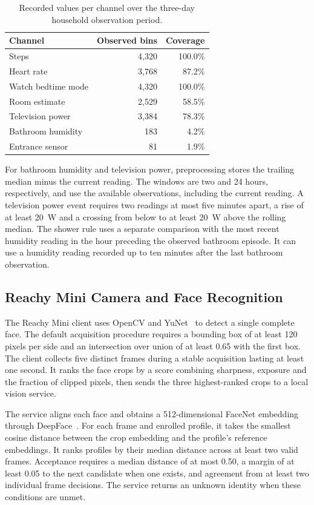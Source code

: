\documentclass[a4paper,twoside]{article}
\begin{document}
\begin{table}[t]
\centering
\caption{Recorded values per channel over the three-day household observation period.}
\label{tab:coverage}
\small
\begin{tabular}{@{}lrr@{}}
\hline
Channel & Observed bins & Coverage \\
\hline
Steps & 4,320 & 100.0\% \\
Heart rate & 3,768 & 87.2\% \\
Watch bedtime mode & 4,320 & 100.0\% \\
Room estimate & 2,529 & 58.5\% \\
Television power & 3,384 & 78.3\% \\
Bathroom humidity & 183 & 4.2\% \\
Entrance sensor & 81 & 1.9\% \\
\hline
\end{tabular}
\end{table}

For bathroom humidity and television power, preprocessing stores the trailing median minus the current reading. The windows are two and 24 hours, respectively, and use the available observations, including the current reading. A television power event requires two readings at most five minutes apart, a rise of at least 20~W and a crossing from below to at least 20~W above the rolling median. The shower rule uses a separate comparison with the most recent humidity reading in the hour preceding the observed bathroom episode. It can use a humidity reading recorded up to ten minutes after the last bathroom observation.

\subsection{Reachy Mini Camera and Face Recognition}
\label{subsec:face}

The Reachy Mini client uses OpenCV and YuNet~\cite{wu2023yunet} to detect a single complete face. The default acquisition procedure requires a bounding box of at least 120 pixels per side and an intersection over union of at least 0.65 with the first box. The client collects five distinct frames during a stable acquisition lasting at least one second. It ranks the face crops by a score combining sharpness, exposure and the fraction of clipped pixels, then sends the three highest-ranked crops to a local vision service.

The service aligns each face and obtains a 512-dimensional FaceNet embedding through DeepFace~\cite{schroff2015facenet,serengil2020lightface}. For each frame and enrolled profile, it takes the smallest cosine distance between the crop embedding and the profile's reference embeddings. It ranks profiles by their median distance across at least two valid frames. Acceptance requires a median distance of at most 0.50, a margin of at least 0.05 to the next candidate when one exists, and agreement from at least two individual frame decisions. The service returns an unknown identity when these conditions are unmet.
\end{document}
